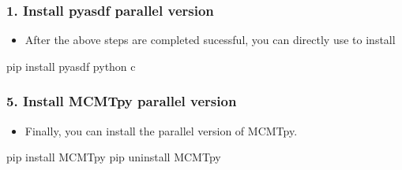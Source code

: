 \documentclass[a4paper,10pt,english,openany]{sphinxmanual}
\begin{document}
\subsubsection{1. Install pyasdf parallel version}
\label{\detokenize{installation:install-pyasdf-parallel-version}}\begin{itemize}
\item {} 
After the above steps are completed sucessful, you can directly use  to install 

\end{itemize}

\begin{sphinxVerbatim}[commandchars=\\\{\}]
\PYGZdl{} pip install pyasdf
\PYGZdl{} python \PYGZhy{}c    
\end{sphinxVerbatim}


\subsubsection{5. Install MCMTpy parallel version}
\label{\detokenize{installation:install-mcmtpy-parallel-version}}\begin{itemize}
\item {} 
Finally, you can install the parallel version of MCMTpy.

\end{itemize}

\begin{sphinxVerbatim}[commandchars=\\\{\}]
\PYGZdl{} pip install MCMTpy        
\PYGZdl{} pip uninstall MCMTpy      
\end{sphinxVerbatim}
\end{document}
